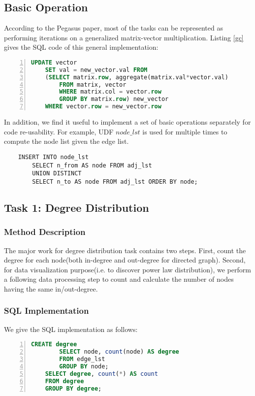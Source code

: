 \subsection{Basic Operation}
According to the Pegasus paper\cite{KangTF11}, most of the tasks can be represented as performing iterations on a generalized matrix-vector multiplication. Listing \ref{gc} gives the SQL code of this general implementation:
\begin{lstlisting}[caption=General Procedure, label=gc, language=SQL, numbers=left, numberstyle=\tiny, breaklines, tabsize=2, frame=single]
	UPDATE vector
	SET val = new_vector.val FROM
	(SELECT matrix.row, aggregate(matrix.val*vector.val)
		FROM matrix, vector
		WHERE matrix.col = vector.row
		GROUP BY matrix.row) new_vector
	WHERE vector.row = new_vector.row
\end{lstlisting}
In addition, we find it useful to implement a set of basic operations separately for code re-usability. For example, UDF $node\_lst$ is used for multiple times to compute the node list given the edge list.
\begin{verbatim}
	INSERT INTO node_lst
		SELECT n_from AS node FROM adj_lst 
		UNION DISTINCT 
		SELECT n_to AS node FROM adj_lst ORDER BY node;
\end{verbatim}

\subsection{Task 1: Degree Distribution}
\subsubsection{Method Description}
The major work for degree distribution task contains two steps. First, count the degree for each node(both in-degree and out-degree for directed graph). Second, for data visualization purpose(i.e. to discover power law distribution), we perform a following data processing step to count and calculate the number of nodes having the same in/out-degree. \\

\subsubsection{SQL Implementation}
We give the SQL implementation as follows:
\begin{lstlisting}[caption=Degree Distribution, label=dd, language=SQL, numbers=left, numberstyle=\tiny, breaklines, tabsize=2, frame=single, keepspaces=false]
	CREATE degree
		SELECT node, count(node) AS degree 
		FROM edge_lst 
		GROUP BY node;
	SELECT degree, count(*) AS count 
	FROM degree
	GROUP BY degree;
\end{lstlisting}

